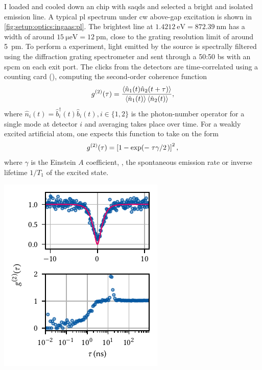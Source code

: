 I loaded and cooled down an  chip with \glspl{saqd} and selected a bright and isolated emission line.
A typical \gls{pl} spectrum under \gls{cw} above-gap excitation is shown in \cref{fig:setup:optics:ingaas:pl}.
The brightest line at $\qty{1.4212}{\eV} = \qty{872.39}{\nano\meter}$ has a width of around $\qty{15}{\micro\eV} = \qty{12}{\pico\meter}$, close to the grating
resolution limit of around \qty{5}{pm}.
To perform a  experiment, light emitted by the source is spectrally filtered using the \thespectrometer diffraction grating spectrometer and sent through a 50:50 \gls{bs} with an \thespcm \gls{spcm} on each exit port.
The clicks from the detectors are time-correlated using a counting card (\tagger), computing the second-order coherence function~\cite{Kimble1976,Walls1979,Cohen-Tannoudji1998}
\begin{equation}
    g^{(2)}(\tau) = \frac{\expval{\hat{n}_1(t)\hat{n}_2(t + \tau)}}{\expval{\hat{n}_1(t)}\expval{\hat{n}_2(t)}},
\end{equation}
where $\hat{n}_i(t) = \hat{b}^\dagger_i(t) \hat{b}_i(t), i\in\lbrace 1,2\rbrace$ is the photon-number operator for a single mode at detector $i$ and averaging takes place over time.
For a weakly excited artificial atom, one expects this function to take on the form~\cite{Walls1979}
\begin{equation}\label{eq:setup:optics:g2:fit}
    \g{2}(\tau) = \left[1 - \exp(-\flatfrac{\tau\gamma}{2})\right]^2,
\end{equation}
where $\gamma$ is the Einstein $A$ coefficient, \ie, the spontaneous emission rate or inverse lifetime $1/T_1$ of the excited state.

\begin{marginfigure}
    \centering
    \includegraphics{img/pdf/setup/ingaas_g2}
    \caption[]{
         measurement of the emission line at \qty{872.267}{\nano\meter} under \gls{cw} excitation with \qty{1}{\micro\watt} at \qty{793}{\nano\meter}.
        The monochromator bandwidth was $\Delta\lambda = \qty{200}{\pico\meter} = \qty{325}{\micro\eV}$.
    }
    \label{fig:setup:optics:ingaas:g2}
\end{marginfigure}

